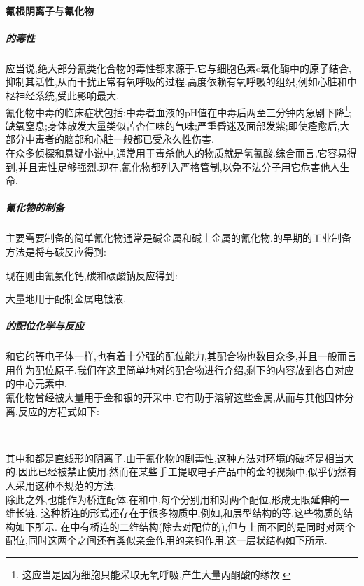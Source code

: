 \documentclass{ctexart}
\begin{document}
\paragraph{氰根阴离子与氰化物}
\subparagraph{的毒性}
应当说,绝大部分氰类化合物的毒性都来源于.它与细胞色素c氧化酶中的原子结合,抑制其活性,从而干扰正常有氧呼吸的过程.高度依赖有氧呼吸的组织,例如心脏和中枢神经系统,受此影响最大.\\
\indent 氰化物中毒的临床症状包括:中毒者血液的pH值在中毒后两至三分钟内急剧下降\footnote{这应当是因为细胞只能采取无氧呼吸,产生大量丙酮酸的缘故.};缺氧窒息;身体散发大量类似苦杏仁味的气味;严重昏迷及面部发紫;即使痊愈后,大部分中毒者的脑部和心脏一般都已受永久性伤害.\\
\indent 在众多侦探和悬疑小说中,通常用于毒杀他人的物质就是氢氰酸.综合而言,它容易得到,并且毒性足够强烈.现在,氰化物都列入严格管制,以免不法分子用它危害他人生命.
\subparagraph{氰化物的制备}
主要需要制备的简单氰化物通常是碱金属和碱土金属的氰化物.的早期的工业制备方法是将与碳反应得到:
\begin{center}
\end{center}
现在则由氰氨化钙,碳和碳酸钠反应得到:
\begin{center}
\end{center}
大量地用于配制金属电镀液.
\subparagraph{的配位化学与反应}
和它的等电子体一样,也有着十分强的配位能力,其配合物也数目众多,并且一般而言用作为配位原子.我们在这里简单地对的配合物进行介绍,剩下的内容放到各自对应的中心元素中.\\
\indent 氰化物曾经被大量用于金和银的开采中,它有助于溶解这些金属,从而与其他固体分离.反应的方程式如下:
\begin{center}
    \\
\end{center}
其中\ce{[Au(CN)2]-}和\ce{[Ag(CN)2]-}都是直线形的阴离子.由于氰化物的剧毒性,这种方法对环境的破坏是相当大的,因此已经被禁止使用.然而在某些手工提取电子产品中的金的视频中,似乎仍然有人采用这种不规范的方法.\\
\indent 除此之外,也能作为桥连配体.在和中,每个分别用和对两个配位,形成无限延伸的一维长链.
这种桥连的形式还存在于很多物质中,例如,和层型结构的等.这些物质的结构如下所示.
在中有桥连的二维结构(除去对配位的),但与上面不同的是同时对两个配位,同时这两个之间还有类似亲金作用的亲铜作用.这一层状结构如下所示.
\end{document}

